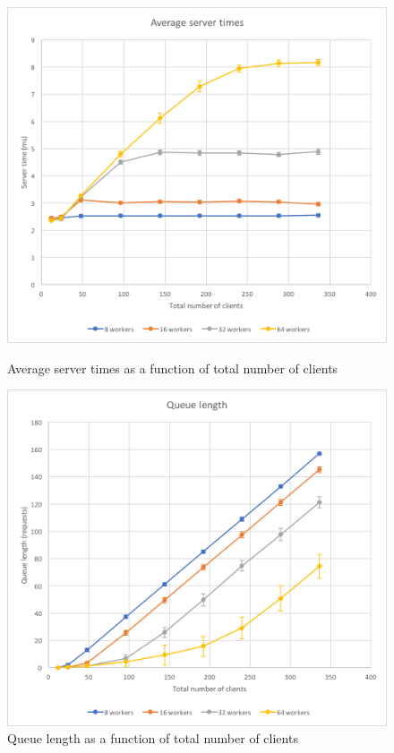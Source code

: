 \documentclass[11pt,a4paper]{article}
\begin{document}
\begin{figure}[!h]
    \centering
    \begin{minipage}[b]{.45\textwidth}
        \centering
        \includegraphics[width=\textwidth]{processing/graphics/throughput_writes_st.png}
        \caption{Average server times as a function of total number of clients}
        \label{png::throughput_writes_st}
    \end{minipage}
    \qquad
    \begin{minipage}[b]{.45\textwidth}
        \centering
        \includegraphics[width=\textwidth]{processing/graphics/throughput_writes_ql.png}
        \caption{Queue length as a function of total number of clients}
        \label{png::throughput_writes_ql}
    \end{minipage}
\end{figure}
\end{document}
